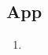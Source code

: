\subsection*{App}

\begin{samepage}
    \begin{enumerate}
        \item %
    \end{enumerate}
\end{samepage}